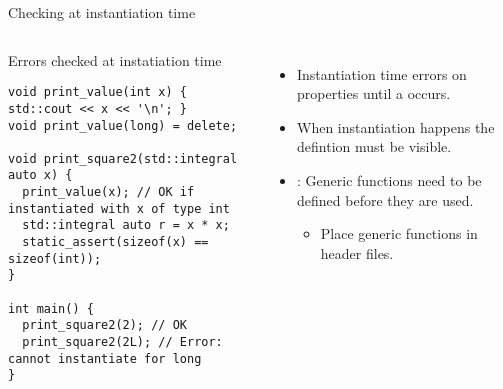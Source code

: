 \begin{frame}[t,fragile]{Checking at instantiation time}

\begin{columns}[T]


\begin{block}{Errors checked at instatiation time}
\begin{lstlisting}
void print_value(int x) { std::cout << x << '\n'; }
void print_value(long) = delete;

void print_square2(std::integral auto x) {
  print_value(x); // OK if instantiated with x of type int
  std::integral auto r = x * x;
  static_assert(sizeof(x) == sizeof(int));
}

int main() {
  print_square2(2); // OK
  print_square2(2L); // Error: cannot instantiate for long
}
\end{lstlisting}
\end{block}


\pause
\begin{itemize}
  \item Instantiation time errors  on properties 
         until a  occurs.

  \item When instantiation happens the defintion must be visible.

  \item {}: Generic functions need to be 
        defined before they are used.
    \begin{itemize}
      \item Place generic functions in header files.
    \end{itemize}
\end{itemize}

\end{columns}

\end{frame}

